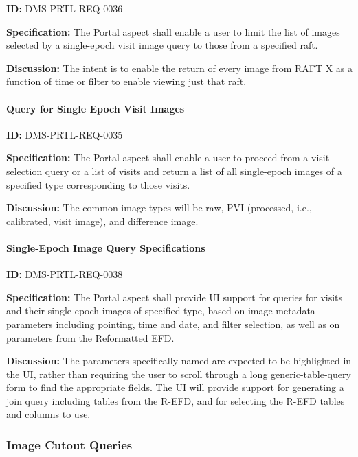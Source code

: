\documentclass[SE,toc,lsstdraft]{lsstdoc}
\begin{document}
\label{DMS-PRTL-REQ-0036}
\textbf{ID:} DMS-PRTL-REQ-0036

\textbf{Specification:}
The Portal aspect shall enable a user to limit the list of images selected by a single-epoch visit image query to those from a specified raft.

\textbf{Discussion:}
The intent is to enable the return of every image from RAFT X as a function of time or filter to enable viewing just that raft.

\paragraph{Query for Single Epoch Visit Images}\hfill  %

\label{DMS-PRTL-REQ-0035}
\textbf{ID:} DMS-PRTL-REQ-0035

\textbf{Specification:}
The Portal aspect shall enable a user to proceed from a visit-selection query or a list of visits and return a list of all single-epoch images of a specified type corresponding to those visits.

\textbf{Discussion:}
The common image types will be raw, PVI (processed, i.e., calibrated, visit image), and difference image.

\paragraph{Single-Epoch Image Query Specifications}\hfill  %

\label{DMS-PRTL-REQ-0038}
\textbf{ID:} DMS-PRTL-REQ-0038

\textbf{Specification:}
The Portal aspect shall provide UI support for queries for visits and their single-epoch images of specified type, based on image metadata parameters including pointing, time and date, and filter selection, as well as on parameters from the Reformatted EFD.

\textbf{Discussion:}
The parameters specifically named are expected to be highlighted in the UI, rather than requiring the user to scroll through a long generic-table-query form to find the appropriate fields.  The UI will provide support for generating a join query including tables from the R-EFD, and for selecting the R-EFD tables and columns to use.

\subsubsection{Image Cutout Queries}
\end{document}
